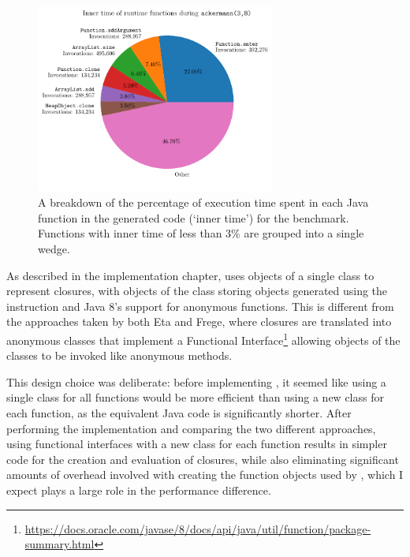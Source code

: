 \documentclass[dissertation.tex]{subfiles}
\begin{document}
{{        \begin{figure}[h]
            \centering
            \captionsetup{width=0.9\textwidth}
            \includegraphics[width=0.7\textwidth]{graphs/perf_profile_ackermann.pdf}
            \caption{A breakdown of the percentage of execution time spent in each Java function in the generated code (`inner time') for the  benchmark. Functions with inner time of less than 3\% are grouped into a single wedge.}
            \label{fig:inner-time}
        \end{figure}

        As described in the implementation chapter, \compilername uses objects of a single class to represent closures, with objects of the class storing  objects generated using the  instruction and Java 8's support for anonymous functions. This is different from the approaches taken by both Eta and Frege, where closures are translated into anonymous classes that implement a Functional Interface\footnote{\url{https://docs.oracle.com/javase/8/docs/api/java/util/function/package-summary.html}} allowing objects of the classes to be invoked like anonymous methods.

        This design choice was deliberate: before implementing \compilername, it seemed like using a single class for all functions would be more efficient than using a new class for each function, as the equivalent Java code is significantly shorter. After performing the implementation and comparing the two different approaches, using functional interfaces with a new class for each function results in simpler code for the creation and evaluation of closures, while also eliminating significant amounts of overhead involved with creating the function objects used by \compilername, which I expect plays a large role in the performance difference.
    }
}
\end{document}
